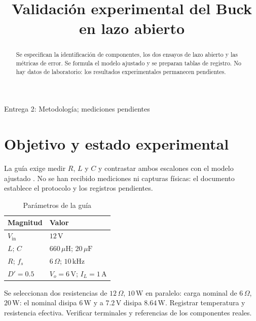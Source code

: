 \documentclass[conference,letterpaper]{IEEEtran}
\begin{document}
\title{Validación experimental del Buck en lazo abierto}\author{
}
\maketitle
\begin{center}\small Entrega 2: Metodología; mediciones pendientes\end{center}
\begin{abstract}Se especifican la identificación de componentes, los dos ensayos de lazo abierto y las métricas de error. Se formula el modelo ajustado y se preparan tablas de registro. No hay datos de laboratorio: los resultados experimentales permanecen pendientes.\end{abstract}
\section{Objetivo y estado experimental}
La guía exige medir $R$, $L$ y $C$ y contrastar ambos escalones con el modelo ajustado \cite{guide}. No se han recibido mediciones ni capturas físicas: el documento establece el protocolo y los registros pendientes.

\begin{table}[H]\caption{Parámetros de la guía}\label{tab:nominal}\centering\footnotesize\setlength{\tabcolsep}{2pt}\renewcommand{\arraystretch}{1.18}\begin{tabularx}{\columnwidth}{LY}\toprule
Magnitud & Valor\\\midrule
$V_{\mathrm{in}}$ & $12\,\mathrm{V}$\\
$L$; $C$ & $660\,\mu\mathrm{H}$; $20\,\mu\mathrm{F}$\\
$R$; $f_s$ & $6\,\Omega$; $10\,\mathrm{kHz}$\\
$D'=0.5$ & $V_o=6\,\mathrm{V}$; $I_L=1\,\mathrm{A}$\\\bottomrule\end{tabularx}\end{table}
Se seleccionan dos resistencias de $12\,\Omega$, $10\,\mathrm{W}$ en paralelo: carga nominal de $6\,\Omega$, $20\,\mathrm{W}$: el nominal disipa $6\,\mathrm{W}$ y a $7.2\,\mathrm{V}$ disipa $8.64\,\mathrm{W}$. Registrar temperatura y resistencia efectiva. Verificar terminales y referencias de los componentes reales.
\end{document}
